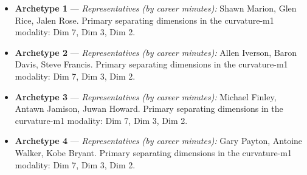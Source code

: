 \begin{itemize}
\item \textbf{Archetype 1} --- \emph{Representatives (by career minutes):} Shawn Marion, Glen Rice, Jalen Rose. Primary separating dimensions in the curvature-m1 modality: Dim 7, Dim 3, Dim 2.
\item \textbf{Archetype 2} --- \emph{Representatives (by career minutes):} Allen Iverson, Baron Davis, Steve Francis. Primary separating dimensions in the curvature-m1 modality: Dim 7, Dim 3, Dim 2.
\item \textbf{Archetype 3} --- \emph{Representatives (by career minutes):} Michael Finley, Antawn Jamison, Juwan Howard. Primary separating dimensions in the curvature-m1 modality: Dim 7, Dim 3, Dim 2.
\item \textbf{Archetype 4} --- \emph{Representatives (by career minutes):} Gary Payton, Antoine Walker, Kobe Bryant. Primary separating dimensions in the curvature-m1 modality: Dim 7, Dim 3, Dim 2.
\end{itemize}

